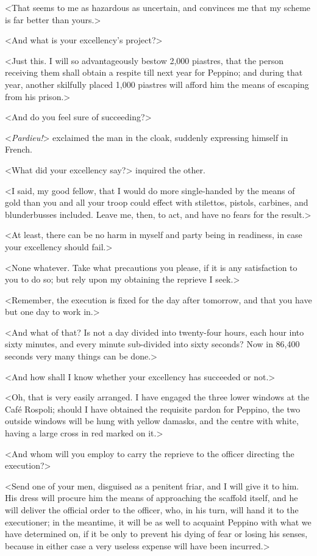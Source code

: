  <That seems to me as hazardous as uncertain, and convinces me that my scheme is far better than yours.> 

 <And what is your excellency's project?> 

 <Just this. I will so advantageously bestow 2,000 piastres, that the person receiving them shall obtain a respite till next year for Peppino; and during that year, another skilfully placed 1,000 piastres will afford him the means of escaping from his prison.> 

 <And do you feel sure of succeeding?> 

 <\textit{Pardieu!}> exclaimed the man in the cloak, suddenly expressing himself in French. 

 <What did your excellency say?> inquired the other. 

 <I said, my good fellow, that I would do more single-handed by the means of gold than you and all your troop could effect with stilettos, pistols, carbines, and blunderbusses included. Leave me, then, to act, and have no fears for the result.> 

 <At least, there can be no harm in myself and party being in readiness, in case your excellency should fail.> 

 <None whatever. Take what precautions you please, if it is any satisfaction to you to do so; but rely upon my obtaining the reprieve I seek.> 

 <Remember, the execution is fixed for the day after tomorrow, and that you have but one day to work in.> 

 <And what of that? Is not a day divided into twenty-four hours, each hour into sixty minutes, and every minute sub-divided into sixty seconds? Now in 86,400 seconds very many things can be done.> 

 <And how shall I know whether your excellency has succeeded or not.> 

 <Oh, that is very easily arranged. I have engaged the three lower windows at the Café Rospoli; should I have obtained the requisite pardon for Peppino, the two outside windows will be hung with yellow damasks, and the centre with white, having a large cross in red marked on it.> 

 <And whom will you employ to carry the reprieve to the officer directing the execution?> 

 <Send one of your men, disguised as a penitent friar, and I will give it to him. His dress will procure him the means of approaching the scaffold itself, and he will deliver the official order to the officer, who, in his turn, will hand it to the executioner; in the meantime, it will be as well to acquaint Peppino with what we have determined on, if it be only to prevent his dying of fear or losing his senses, because in either case a very useless expense will have been incurred.> 

